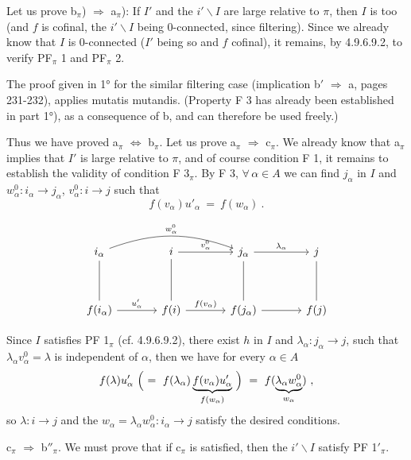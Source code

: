 Let us prove b$_\pi$) $\Longrightarrow$ a$_\pi$): If $I'$ and the $i'\backslash I$ are large relative to $\pi$, then $I$ is too (and $f$ is cofinal, the $i'\backslash I$ being 0-connected, since filtering). Since we already know that $I$ is 0-connected ($I'$ being so and $f$ cofinal), it remains, by 4.9.6.9.2, to verify PF$_\pi$ 1 and PF$_\pi$ 2.

The proof given in 1° for the similar filtering case (implication b$'$ $\Longrightarrow$ a, pages 231-232), applies mutatis mutandis. (Property F 3 has already been established in part 1°), as a consequence of b, and can therefore be used freely.)

Thus we have proved a$_\pi$ $\Longleftrightarrow$ b$_\pi$. Let us prove a$_\pi$ $\Longrightarrow$ c$_\pi$. We already know that a$_\pi$ implies that $I'$ is large relative to $\pi$, and of course condition F 1, it remains to establish the validity of condition F 3$_\pi$. By F 3, $\forall\, \alpha \in A$ we can find $j_\alpha$ in $I$ and $w^0_\alpha : i_\alpha \longrightarrow j_\alpha$, $v^0_\alpha : i \longrightarrow j$ such that %
\[
f(v_\alpha)u'_\alpha \ = \ f(w_\alpha) \ .
\]


\[
\begin{tikzcd}[column sep=large, row sep=huge]
i_\alpha \arrow[rr, bend left=20, "w^0_\alpha"] \arrow[d, dash] & i \arrow[r, "v^0_\alpha"] \arrow[d, dash] & j_\alpha \arrow[r, "\lambda_\alpha"] \arrow[d, dash] & j \arrow[d, dash] \\
f(i_\alpha) \arrow[r, "u'_\alpha"] & f(i) \arrow[r, "f(v_\alpha)"] & f(j_\alpha) \arrow[r] & f(j)
\end{tikzcd}
\]

Since $I$ satisfies PF 1$_\pi$ (cf. 4.9.6.9.2), there exist $h$ in $I$ and $\lambda_\alpha : j_\alpha \longrightarrow j$, such that $\lambda_\alpha v^0_\alpha = \lambda$ is independent of $\alpha$, then we have for every $\alpha \in A$ %
\[
f(\lambda)u'_\alpha \ \Bigl( \ = \ f(\lambda_\alpha)\underbrace{f(v_\alpha)u'_\alpha}_{f(w_\alpha)} \ \Bigr) \ = \ f(\underbrace{\lambda_\alpha w^0_\alpha}_{w_\alpha}) \ ,
\]
so $\lambda : i \longrightarrow j$ and the $w_\alpha = \lambda_\alpha w^0_\alpha : i_\alpha \longrightarrow j$ satisfy the desired conditions.

c$_\pi$ $\Longrightarrow$ b$''_\pi$. We must prove that if c$_\pi$ is satisfied, then the $i'\backslash I$ satisfy PF 1$'_\pi$.

